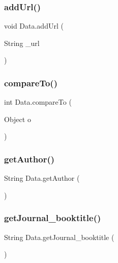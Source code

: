 \hypertarget{class_data_a0f3fd3bbb22e15759be23fc1bf8a54b9}{}\label{class_data_a0f3fd3bbb22e15759be23fc1bf8a54b9} 
\subsubsection{\texorpdfstring{add\+Url()}{addUrl()}}
{\footnotesize\ttfamily void Data.\+add\+Url (\begin{DoxyParamCaption}\item[{String}]{\+\_\+url }\end{DoxyParamCaption})}

\hypertarget{class_data_af0585a116e5d386a0d513b8f1549411a}{}\label{class_data_af0585a116e5d386a0d513b8f1549411a} 
\subsubsection{\texorpdfstring{compare\+To()}{compareTo()}}
{\footnotesize\ttfamily int Data.\+compare\+To (\begin{DoxyParamCaption}\item[{Object}]{o }\end{DoxyParamCaption})}

\hypertarget{class_data_a4163034911e6f4b0b3e4bd2135824c5f}{}\label{class_data_a4163034911e6f4b0b3e4bd2135824c5f} 
\subsubsection{\texorpdfstring{get\+Author()}{getAuthor()}}
{\footnotesize\ttfamily String Data.\+get\+Author (\begin{DoxyParamCaption}{ }\end{DoxyParamCaption})}

\hypertarget{class_data_ac1e4612845513c0826716962bcad943c}{}\label{class_data_ac1e4612845513c0826716962bcad943c} 
\subsubsection{\texorpdfstring{get\+Journal\+\_\+booktitle()}{getJournal\_booktitle()}}
{\footnotesize\ttfamily String Data.\+get\+Journal\+\_\+booktitle (\begin{DoxyParamCaption}{ }\end{DoxyParamCaption})}

